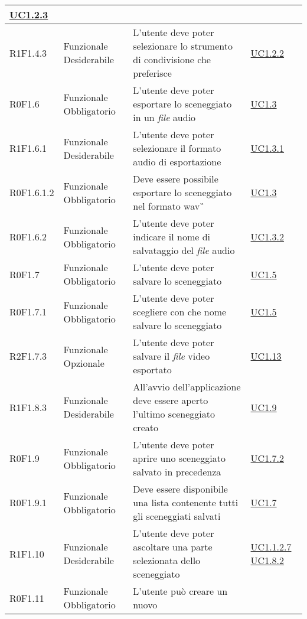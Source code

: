 \begin{center}
\begin{longtable}{| p{2.5cm} | p{3cm} | p{5.25cm} | p{2cm} |}
\hyperref[sec:UC1.2.3]{ UC1.2.3 }  \\ \hline  R1F1.4.3 & Funzionale \newline Desiderabile & L'utente deve poter selezionare lo strumento di condivisione che preferisce &  \hyperref[sec:UC1.2.2]{ UC1.2.2 }  \\ \hline  R0F1.6 & Funzionale \newline Obbligatorio & L'utente deve poter esportare lo sceneggiato in un \textit{file} audio &  \hyperref[sec:UC1.3]{ UC1.3 }  \\ \hline  R1F1.6.1 & Funzionale \newline Desiderabile & L'utente deve poter selezionare il formato audio di esportazione &  \hyperref[sec:UC1.3.1]{ UC1.3.1 }  \\ \hline  R0F1.6.1.2 & Funzionale \newline Obbligatorio & Deve essere possibile esportare lo sceneggiato nel formato wav\G\ &  \hyperref[sec:UC1.3]{ UC1.3 }  \\ \hline  R0F1.6.2 & Funzionale \newline Obbligatorio & L'utente deve poter indicare il nome di salvataggio del \textit{file} audio &  \hyperref[sec:UC1.3.2]{ UC1.3.2 }  \\ \hline  R0F1.7 & Funzionale \newline Obbligatorio & L'utente deve poter salvare lo sceneggiato &  \hyperref[sec:UC1.5]{ UC1.5 }  \\ \hline  R0F1.7.1 & Funzionale \newline Obbligatorio & L'utente deve poter scegliere con che nome salvare lo sceneggiato &  \hyperref[sec:UC1.5]{ UC1.5 }  \\ \hline  R2F1.7.3 & Funzionale \newline Opzionale & L'utente deve poter salvare il \textit{file} video esportato &  \hyperref[sec:UC1.13]{ UC1.13 }  \\ \hline  R1F1.8.3 & Funzionale \newline Desiderabile & All'avvio dell'applicazione deve essere aperto l'ultimo sceneggiato creato &  \hyperref[sec:UC1.9]{ UC1.9 }  \\ \hline  R0F1.9 & Funzionale \newline Obbligatorio & L'utente deve poter aprire uno sceneggiato salvato in precedenza &  \hyperref[sec:UC1.7.2]{ UC1.7.2 }  \\ \hline  R0F1.9.1 & Funzionale \newline Obbligatorio & Deve essere disponibile una lista contenente tutti gli sceneggiati salvati  &  \hyperref[sec:UC1.7]{ UC1.7 }  \\ \hline  R1F1.10 & Funzionale \newline Desiderabile & L'utente deve poter ascoltare una parte selezionata dello sceneggiato &  \hyperref[sec:UC1.1.2.7]{ UC1.1.2.7 } \newline \hyperref[sec:UC1.8.2]{ UC1.8.2 }  \\ \hline  R0F1.11 & Funzionale \newline Obbligatorio & L'utente può creare un nuovo 
\end{longtable}
\end{center}
